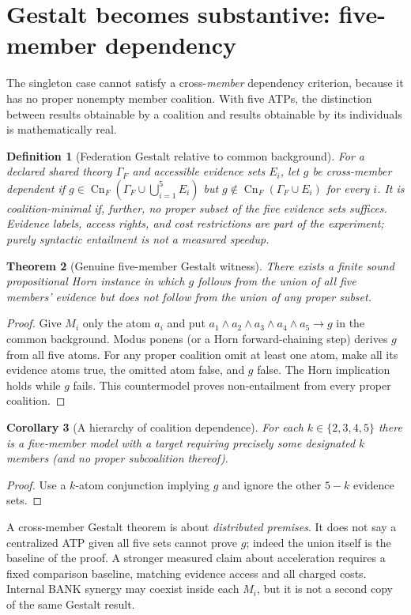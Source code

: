 \documentclass[11pt]{article}
\newtheorem{theorem}{Theorem}[section]
\newtheorem{definition}[theorem]{Definition}
\newtheorem{corollary}[theorem]{Corollary}
\newcommand{\Cn}{\operatorname{Cn}}
\begin{document}
\section{Gestalt becomes substantive: five-member dependency}
The singleton case cannot satisfy a cross-\emph{member} dependency criterion, because it has no proper nonempty member coalition. With five ATPs, the distinction between results obtainable by a coalition and results obtainable by its individuals is mathematically real.
\begin{definition}[Federation Gestalt relative to common background]
For a declared shared theory $\Gamma_F$ and accessible evidence sets $E_i$, let $g$ be \emph{cross-member dependent} if $g\in\Cn_F(\Gamma_F\cup\bigcup_{i=1}^5 E_i)$ but $g\notin\Cn_F(\Gamma_F\cup E_i)$ for every $i$. It is \emph{coalition-minimal} if, further, no proper subset of the five evidence sets suffices. Evidence labels, access rights, and cost restrictions are part of the experiment; purely syntactic entailment is not a measured speedup.
\end{definition}
\begin{theorem}[Genuine five-member Gestalt witness]
There exists a finite sound propositional Horn instance in which $g$ follows from the union of all five members' evidence but does not follow from the union of any proper subset.
\end{theorem}
\begin{proof}Give $M_i$ only the atom $a_i$ and put $a_1\wedge a_2\wedge a_3\wedge a_4\wedge a_5\to g$ in the common background. Modus ponens (or a Horn forward-chaining step) derives $g$ from all five atoms. For any proper coalition omit at least one atom, make all its evidence atoms true, the omitted atom false, and $g$ false. The Horn implication holds while $g$ fails. This countermodel proves non-entailment from every proper coalition.\end{proof}
\begin{corollary}[A hierarchy of coalition dependence]
For each $k\in\{2,3,4,5\}$ there is a five-member model with a target requiring precisely some designated $k$ members (and no proper subcoalition thereof).
\end{corollary}
\begin{proof}Use a $k$-atom conjunction implying $g$ and ignore the other $5-k$ evidence sets.\end{proof}
A cross-member Gestalt theorem is about \emph{distributed premises}. It does not say a centralized ATP given all five sets cannot prove $g$; indeed the union itself is the baseline of the proof. A stronger measured claim about acceleration requires a fixed comparison baseline, matching evidence access and all charged costs. Internal BANK synergy may coexist inside each $M_i$, but it is not a second copy of the same Gestalt result.
\end{document}
